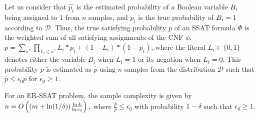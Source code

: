 Let us consider that $\widehat{p_i}$ is the estimated probability of a Boolean variable $ B_i $ being assigned to $ 1 $ from $ n $ samples, and $p_i$ is the true probability of $ B_i = 1 $ according to $ \mathcal{D} $. 
Thus, the true satisfying probability $p$ of an SSAT formula $ \Phi $ is the weighted sum of all satisfying assignments of the CNF $ \phi $, $p = \sum_{\sigma^*} \prod_{L_i \in {\sigma^*}}L_i * p_i + (1 - L_i) * (1 - p_i)$, where the literal $ L_i \in \{0,1\} $ denotes either the variable $ B_i $ when $ L_i = 1 $ or its negation when $ L_i = 0 $. This probability $ p $ is estimated as $\widehat{p}$ using $n$ samples from the distribution $\mathcal{D}$ such that $\widehat{p} \leq \epsilon_0 p$ for $\epsilon_0 \geq 1$. 
\iffalse
If we consider $\epsilon_i = \frac{\ln \epsilon_0}{2^i}$, we obtain
\begin{equation*}
\begin{split}
\prod_{i =1}^m (1 \pm \epsilon_i) &\leq \left(\frac{1}{n} \sum_{i} (1 + \epsilon_i)\right)^n \\
&= (\frac{1}{n} \sum_{i} (1+\frac{\ln \epsilon_0}{2^i})^n\\
&\leq (1  +\frac{\ln \epsilon_0}{n})^n\\
&\leq e^{\ln \epsilon_0} = \epsilon_0.\notag
\end{split}
\end{equation*}
\fi
\begin{theorem}\label{fairness_justicia_thm:sample}
	For an ER-SSAT problem, the sample complexity is given by 
	$ n = O\left((m+ \ln(1/\delta))\frac{\ln k}{\ln \epsilon_0} \right),$
	where $\frac{\widehat{p}}{p} \leq \epsilon_0$ with probability $1-\delta$ such that $\epsilon_0 \geq 1$.
\end{theorem}
